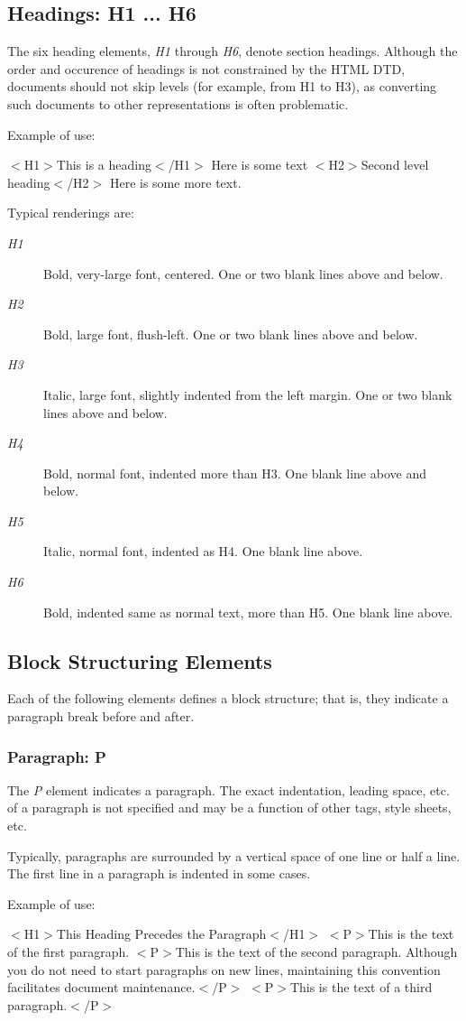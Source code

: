 \subsection*{Headings:  H1 ...  H6}\par 
The six heading elements, {\it H1} through {\it H6}, denote section
headings.  Although the order and occurence of headings is not
constrained by the HTML DTD, documents should not skip levels (for
example, from H1 to H3), as converting such documents to other
representations is often problematic.
\par \par 
Example of use:
\par $<$H1$>$This is a heading$<$/H1$>$
Here is some text
$<$H2$>$Second level heading$<$/H2$>$
Here is some more text.
\par 
Typical renderings are:
\par \begin{description}\item[{\it H1}]
Bold, very-large font, centered.  One or two blank lines
above and below.
\item[{\it H2}]
Bold, large font, flush-left.  One or two blank lines
above and below.
\item[{\it H3}]
Italic, large font, slightly indented from the left
margin.  One or two blank lines above and below.
\item[{\it H4}]
Bold, normal font, indented more than H3.  One blank
line above and below.
\item[{\it H5}]
Italic, normal font, indented as H4.  One blank line
above.
\item[{\it H6}]
Bold, indented same as normal text, more than H5.  One
blank line above.
\end{description}\subsection*{Block Structuring Elements}\par 
Each of the following elements defines a block structure;  that is,
they indicate a paragraph break before and after.
\par \subsubsection*{Paragraph:  P}\par 
The {\it P} element indicates a paragraph.  The exact indentation,
leading space, etc.  of a paragraph is not specified and may be a
function of other tags, style sheets, etc.
\par \par 
Typically, paragraphs are surrounded by a vertical space of one
line or half a line.  The first line in a paragraph is indented in some
cases.
\par \par 
Example of use:
\par $<$H1$>$This Heading Precedes the Paragraph$<$/H1$>$
$<$P$>$This is the text of the first paragraph.
$<$P$>$This is the text of the second paragraph. Although you do not 
need to start paragraphs on new lines, maintaining this 
convention facilitates document maintenance.$<$/P$>$
$<$P$>$This is the text of a third paragraph.$<$/P$>$
